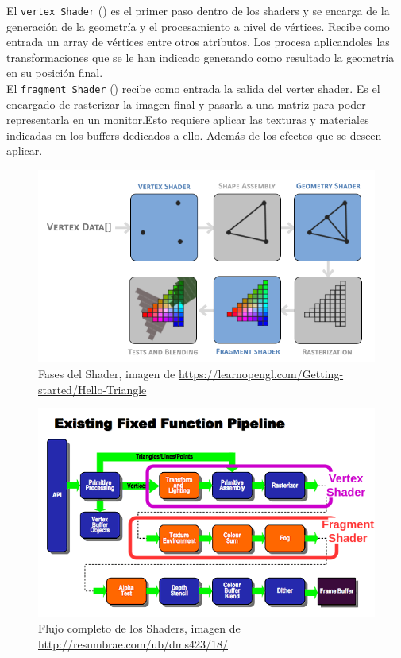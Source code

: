El \texttt{vertex Shader} (\cite{VertexShaderOpenGL}) es el primer paso dentro de los shaders y se encarga de la generación de la geometría y el procesamiento a nivel de vértices. Recibe como entrada un array de vértices entre otros atributos. Los procesa aplicandoles las transformaciones que se le han indicado generando como resultado la geometría en su posición final.\\


El \texttt{fragment Shader} (\cite{FragmentShaderOpenGL}) recibe como entrada la salida del verter shader. Es el encargado de rasterizar la imagen final y pasarla a una matriz para poder representarla en un monitor.Esto requiere aplicar las texturas y materiales indicadas en los buffers dedicados a ello. Además de los efectos que se deseen aplicar.\\


\begin{figure} %
	\centering
	\includegraphics[scale=2]{imagenes/pipeline.png} 
	\caption{ Fases del Shader, imagen de \url{https://learnopengl.com/Getting-started/Hello-Triangle} } \label{fig:pipeline.png}
\end{figure}


\begin{figure} %
	\centering
	\includegraphics[scale=0.7]{imagenes/opengles_1x_pipeline.png} 
	\caption{ Flujo completo de los Shaders, imagen de \url{http://resumbrae.com/ub/dms423/18/} } \label{fig:opengles_1x_pipeline.png}
\end{figure}


